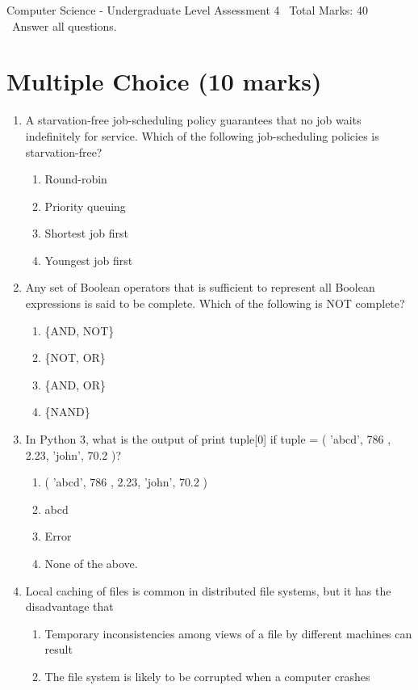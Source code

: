 \documentclass[12pt]{article}
\begin{document}
\begin{center}
Computer Science - Undergraduate Level Assessment 4 \
Total Marks: 40 \
Answer all questions.
\end{center}

\section*{Multiple Choice (10 marks)}
\begin{enumerate}[label=\arabic*.]
\item A starvation-free job-scheduling policy guarantees that no job waits indefinitely for service. Which of the following job-scheduling policies is starvation-free?
\begin{enumerate}[label=(\alph*)]
    \item Round-robin
    \item Priority queuing
    \item Shortest job first
    \item Youngest job first
\end{enumerate}
\item Any set of Boolean operators that is sufficient to represent all Boolean expressions is said to be complete. Which of the following is NOT complete?
\begin{enumerate}[label=(\alph*)]
    \item \{AND, NOT\}
    \item \{NOT, OR\}
    \item \{AND, OR\}
    \item \{NAND\}
\end{enumerate}
\item In Python 3, what is the output of print tuple[0] if tuple = ( 'abcd', 786 , 2.23, 'john', 70.2 )?
\begin{enumerate}[label=(\alph*)]
    \item ( 'abcd', 786 , 2.23, 'john', 70.2 )
    \item abcd
    \item Error
    \item None of the above.
\end{enumerate}
\item Local caching of files is common in distributed file systems, but it has the disadvantage that
\begin{enumerate}[label=(\alph*)]
    \item Temporary inconsistencies among views of a file by different machines can result
    \item The file system is likely to be corrupted when a computer crashes

\end{enumerate}
\end{enumerate}
\end{document}
